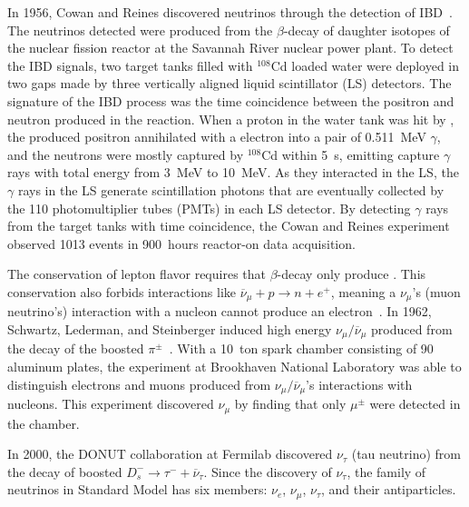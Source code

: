     In 1956, Cowan and Reines discovered neutrinos through the detection of IBD~\cite{bib:CowanReines}.
    The neutrinos detected were \nuebar produced from the $\beta$-decay of daughter isotopes of the nuclear fission reactor at the Savannah River nuclear power plant.
    To detect the IBD signals, two target tanks filled with $^{108}$Cd loaded water were deployed in two gaps made by three vertically aligned liquid scintillator (LS) detectors.
    The signature of the IBD process was the time coincidence between the positron and neutron produced in the reaction.
    When a proton in the water tank was hit by \nuebar, the produced positron annihilated with a electron into a pair of 0.511~MeV $\gamma$, and the neutrons were mostly captured by $^{108}$Cd within 5~\textmu s, emitting capture $\gamma$ rays with total energy from 3~MeV to 10~MeV.
    As they interacted in the LS, the $\gamma$ rays in the LS generate scintillation photons that are eventually collected by the 110 photomultiplier tubes (PMTs) in each LS detector. 
    By detecting $\gamma$ rays from the target tanks with time coincidence, the Cowan and Reines experiment observed 1013 \nuebar events in 900~hours reactor-on data acquisition.
    
    The conservation of lepton flavor requires that $\beta$-decay only produce \nuebar.
    This conservation also forbids interactions like $\overline{\nu}_\mu + p \rightarrow n + e^+$, meaning a ${\nu}_\mu$'s (muon neutrino's) interaction with a nucleon cannot produce an electron~\cite{bib:Ponte1959, bib:Schwartz}.
    In 1962, Schwartz, Lederman, and Steinberger induced high energy $\nu_\mu/\overline{\nu}_\mu$ produced from the decay of the boosted $\pi^\pm$~\cite{bib:numuDiscovery}.
    With a 10~ton spark chamber consisting of 90 aluminum plates, the experiment at Brookhaven National Laboratory was able to distinguish electrons and muons produced from $\nu_\mu/\overline{\nu}_\mu$'s interactions with nucleons. 
    This experiment discovered $\nu_\mu$ by finding that only $\mu^\pm$ were detected in the chamber.
    
    In 2000, the DONUT collaboration at Fermilab discovered $\nu_\tau$ (tau neutrino)  from the decay of boosted $D_s^- \rightarrow \tau^- + \overline{\nu}_\tau$. 
    Since the discovery of $\nu_\tau$, the family of neutrinos in Standard Model has six members: $\nu_e$, $\nu_\mu$, $\nu_\tau$, and their antiparticles.
    
    
